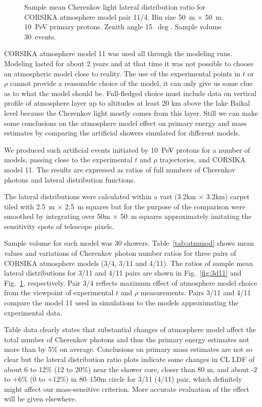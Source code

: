 \documentclass[final,5p,times,twocolumn]{elsarticle}
\begin{document}
\begin{figure}[tb]
\begin{minipage}[t]{0.48\textwidth}
    \vspace{-1.0pc}
    \caption{Sample mean Cherenkov light lateral distribution ratio for CORSIKA atmosphere model
    pair 11/4. Bin size 50~m $\times$ 50~m. 10~PeV primary protons. Zenith angle 15~$\deg$. Sample volume 30~events.}
\label{fig:4d11}
\end{minipage}
\end{figure}


CORSIKA atmosphere model 11 was used all through the modeling runs. Modeling lasted for about 2 years and at that time it was not possible to choose an atmospheric model close to reality. The use of the experimental points in $t$ or $\rho$ cannot provide a reasonable  choice of the model, it can only give us some clue as to what the model should be. Full-fledged choice must include data on vertical profile of atmosphere layer up to altitudes at least 20 km above the lake Baikal level because the Cherenkov light mostly comes from this layer. Still we can make some conclusions on the atmosphere model effect on primary energy and mass estimates by comparing the artificial showers simulated for different models.

We produced such artificial events initiated by 10~PeV protons for a number of models, passing close to the experimental $t$ and $\rho$ trajectories, and CORSIKA model 11. The results are expressed as ratios of full numbers of Cherenkov photons and lateral distribution functions.

The lateral distributions were calculated within a vast (3.2km $\times$ 3.2km) carpet tiled with 2.5~m $\times$ 2.5~m squares but for the purpose of the comparison were smoothed by integrating over 50m $\times$ 50~m squares approximately imitating the sensitivity spots of telescope pixels.

Sample volume for each model was 30 showers. Table~\ref{tab:atmmod} shows mean values and variations of Cherenkov photon number ratios for three pairs of CORSIKA atmosphere models (3/4, 3/11 and 4/11). The ratios of sample mean lateral distributions for 3/11 and 4/11 pairs are shown in Fig.~\ref{fig:3d11} and Fig.~\ref{fig:4d11}, respectively. Pair 3/4 reflects maximum effect of atmosphere model choice from the viewpoint of experimental $t$ and $\rho$ measurements. Pairs 3/11 and 4/11 compare the model 11 used in simulations to the models approximating the experimental data.

Table data clearly states that substantial changes of atmosphere model affect the total number of Cherenkov photons and thus the primary energy estimates not more than by 5\% on average. Conclusions on primary mass estimates are not so clear but the lateral distribution ratio plots indicate some changes in CL LDF of about 6 to 12\% (12 to 20\%) near the shower core, closer than 80 m, and about -2 to +6\% (0 to +12\%) in 80--150m circle for 3/11 (4/11) pair, which definitely might affect our mass-sensitive criterion. More accurate evaluation of the effect will be given elsewhere.
\end{document}
